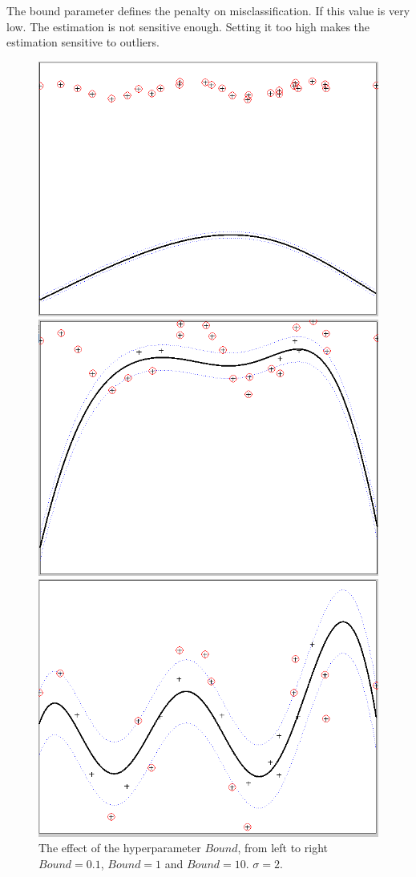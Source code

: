 \documentclass[•]{article}
\begin{document}
The bound parameter defines the penalty on misclassification. If this value is very low. The estimation is not sensitive enough. Setting it too high makes the estimation sensitive to outliers.

\begin{figure}[H]
\centering
\begin{minipage}{.3\textwidth}
\includegraphics[width=.8\textwidth]{bound01.png}
\end{minipage}
\begin{minipage}{.3\textwidth}
\includegraphics[width=.8\textwidth]{bound1.png}
\end{minipage}
\begin{minipage}{.3\textwidth}
\includegraphics[width=.8\textwidth]{bound10.png}
\end{minipage}
\caption{The effect of the hyperparameter $Bound$, from left to right $Bound=0.1$, $Bound=1$ and $Bound=10$. $\sigma = 2$.}
\end{figure}
\end{document}
